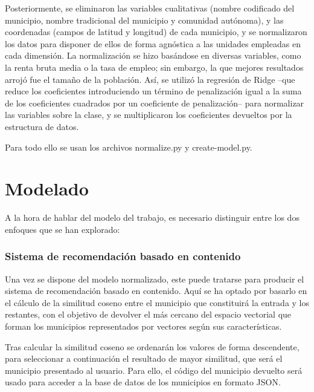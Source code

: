 Posteriormente, se eliminaron las variables cualitativas (nombre codificado del municipio, nombre tradicional del municipio y comunidad autónoma), y las coordenadas (campos de latitud y longitud) de cada municipio, y se normalizaron los datos para disponer de ellos de forma agnóstica a las unidades empleadas en cada dimensión. La normalización se hizo basándose en diversas variables, como la renta bruta media o la tasa de empleo; sin embargo, la que mejores resultados arrojó fue el tamaño de la población. Así, se utilizó la regresión de Ridge –que reduce los coeficientes introduciendo un término de penalización igual a la suma de los coeficientes cuadrados por un coeficiente de penalización– para normalizar las variables sobre la clase, y se multiplicaron los coeficientes devueltos por la estructura de datos.

Para todo ello se usan los archivos normalize.py y create-model.py.

\section{Modelado}

A la hora de hablar del modelo del trabajo, es necesario distinguir entre los dos enfoques que se han explorado:

\subsubsection{Sistema de recomendación basado en contenido}

Una vez se dispone del modelo normalizado, este puede tratarse para producir el sistema de recomendación basado en contenido. Aquí se ha optado por basarlo en el cálculo de la similitud coseno entre el municipio que constituirá la entrada y los restantes, con el objetivo de devolver el más cercano del espacio vectorial que forman los municipios representados por vectores según sus características.

Tras calcular la similitud coseno se ordenarán los valores de forma descendente, para seleccionar a continuación el resultado de mayor similitud, que será el municipio presentado al usuario. Para ello, el código del municipio devuelto será usado para acceder a la base de datos de los municipios en formato JSON.


